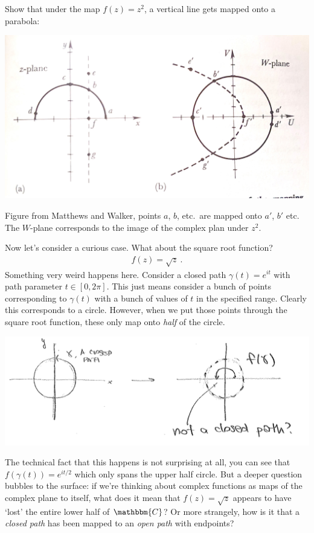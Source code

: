 \begin{exercise}
Show that under the map $f(z)=z^2$, a vertical line gets mapped onto a parabola:
\begin{center}
\includegraphics[width=.7\textwidth]{figures/lec13z2.jpg}
\end{center}
Figure from Matthews and Walker, points $a$, $b$, etc.\ are mapped onto $a'$, $b'$ etc. The $W$-plane corresponds to the image of the complex plan under $z^2$.
\end{exercise}

Now let's consider a curious case. What about the square root function?
\begin{align}
	f(z) = \sqrt{z} \ .
\end{align}
Something very weird happens here. Consider a closed path $\gamma(t) = e^{it}$ with path parameter $t \in [0,2\pi]$. This just means consider a bunch of points corresponding to $\gamma(t)$ with a bunch of values of $t$ in the specified range. Clearly this corresponds to a circle. However, when we put those points through the square root function, these only map onto \emph{half} of the circle. 
\begin{center}
\includegraphics[width=\textwidth]{figures/lec13_map3.png}
\end{center}
The technical fact that this happens is not surprising at all, you can see that $f(\gamma(t)) = e^{it/2}$ which only spans the upper half circle. But a deeper question bubbles to the surface: if we're thinking about complex functions as maps of the complex plane to itself, what does it mean that $f(z) = \sqrt{z}$ appears to have `lost' the entire lower half of $\mathbbm{C}$? Or more strangely, how is it that a \emph{closed path} has been mapped to an \emph{open path} with endpoints?

